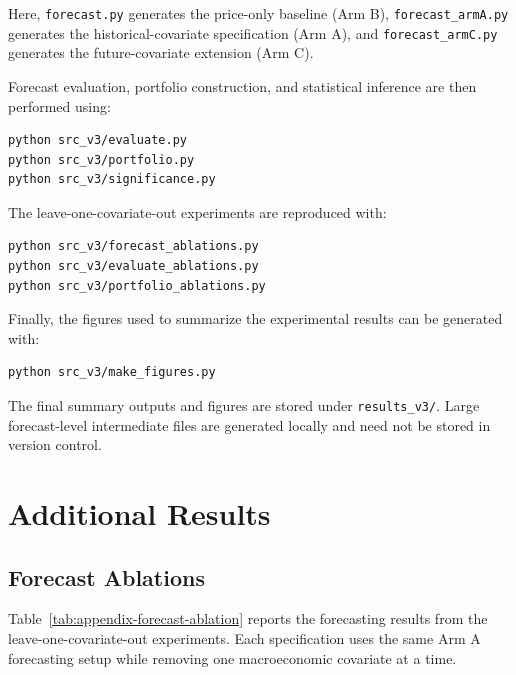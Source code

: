 \documentclass[12pt,a4paper,twoside,openany]{book}
\begin{document}
Here, \texttt{forecast.py} generates the price-only baseline (Arm B),
\texttt{forecast\_armA.py} generates the historical-covariate
specification (Arm A), and \texttt{forecast\_armC.py} generates the
future-covariate extension (Arm C).

Forecast evaluation, portfolio construction, and statistical inference
are then performed using:

\begin{verbatim}
python src_v3/evaluate.py
python src_v3/portfolio.py
python src_v3/significance.py
\end{verbatim}

The leave-one-covariate-out experiments are reproduced with:

\begin{verbatim}
python src_v3/forecast_ablations.py
python src_v3/evaluate_ablations.py
python src_v3/portfolio_ablations.py
\end{verbatim}

Finally, the figures used to summarize the experimental results can be
generated with:

\begin{verbatim}
python src_v3/make_figures.py
\end{verbatim}

The final summary outputs and figures are stored under
\texttt{results\_v3/}. Large forecast-level intermediate files are
generated locally and need not be stored in version control.

\chapter{Additional Results}
\label{appendix-additional-results}

\section{Forecast Ablations}
\label{appendix-forecast-ablations}

Table~\ref{tab:appendix-forecast-ablation} reports the forecasting
results from the leave-one-covariate-out experiments. Each specification
uses the same Arm A forecasting setup while removing one macroeconomic
covariate at a time.
\end{document}
